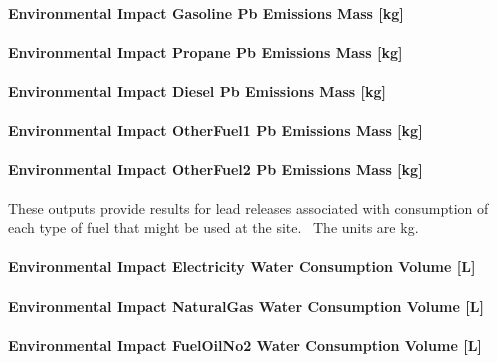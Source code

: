 \paragraph{Environmental Impact Gasoline Pb Emissions Mass {[}kg{]}}\label{environmental-impact-gasoline-pb-emissions-mass-kg}

\paragraph{Environmental Impact Propane Pb Emissions Mass {[}kg{]}}\label{environmental-impact-propane-pb-emissions-mass-kg}

\paragraph{Environmental Impact Diesel Pb Emissions Mass {[}kg{]}}\label{environmental-impact-diesel-pb-emissions-mass-kg}

\paragraph{Environmental Impact OtherFuel1 Pb Emissions Mass {[}kg{]}}\label{environmental-impact-otherfuel1-pb-emissions-mass-kg}

\paragraph{Environmental Impact OtherFuel2 Pb Emissions Mass {[}kg{]}}\label{environmental-impact-otherfuel2-pb-emissions-mass-kg}

These outputs provide results for lead releases associated with consumption of each type of fuel that might be used at the site.~ The units are kg.

\paragraph{Environmental Impact Electricity Water Consumption Volume {[}L{]}}\label{environmental-impact-electricity-water-consumption-volume-l}

\paragraph{Environmental Impact NaturalGas Water Consumption Volume {[}L{]}}\label{environmental-impact-natural-gas-water-consumption-volume-l}

\paragraph{Environmental Impact FuelOilNo2 Water Consumption Volume {[}L{]}}\label{environmental-impact-fuel-oil-2-water-consumption-volume-l}

